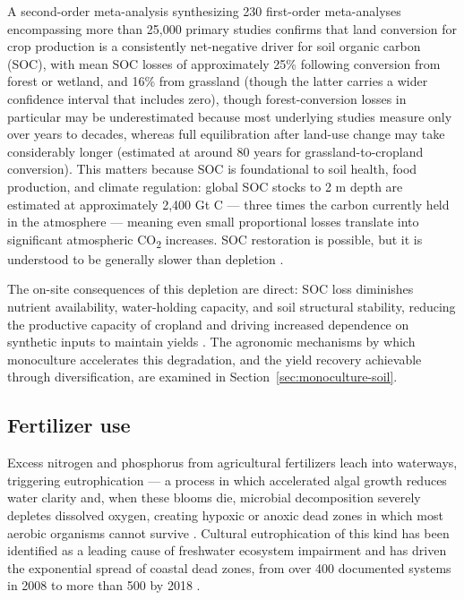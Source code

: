 A second-order meta-analysis synthesizing 230 first-order meta-analyses encompassing more than 25,000 primary studies confirms that land conversion for crop production is a consistently net-negative driver for soil organic carbon (SOC), with mean SOC losses of approximately 25\% following conversion from forest or wetland, and 16\% from grassland (though the latter carries a wider confidence interval that includes zero), though forest-conversion losses in particular may be underestimated because most underlying studies measure only over years to decades, whereas full equilibration after land-use change may take considerably longer (estimated at around 80 years for grassland-to-cropland conversion). This matters because SOC is foundational to soil health, food production, and climate regulation: global SOC stocks to 2 m depth are estimated at approximately 2,400 Gt C — three times the carbon currently held in the atmosphere — meaning even small proportional losses translate into significant atmospheric CO\textsubscript{2} increases. SOC restoration is possible, but it is understood to be generally slower than depletion \cite{beillouin2023soc}.

The on-site consequences of this depletion are direct: SOC loss diminishes nutrient availability, water-holding capacity, and soil structural stability, reducing the productive capacity of cropland and driving increased dependence on synthetic inputs to maintain yields \cite[pp.~4--5]{lal2004soilcarbon}. The agronomic mechanisms by which monoculture accelerates this degradation, and the yield recovery achievable through diversification, are examined in Section~\ref{sec:monoculture-soil}.

\subsection{Fertilizer use}\label{sec:fertilizers}
Excess nitrogen and phosphorus from agricultural fertilizers leach into waterways, triggering eutrophication — a process in which accelerated algal growth reduces water clarity and, when these blooms die, microbial decomposition severely depletes dissolved oxygen, creating hypoxic or anoxic dead zones in which most aerobic organisms cannot survive \cite[Consequences]{chislock2013}. Cultural eutrophication of this kind has been identified as a leading cause of freshwater ecosystem impairment \cite[p.~1]{carpenter1998nonpoint} and has driven the exponential spread of coastal dead zones, from over 400 documented systems in 2008 \cite[p.~926]{diaz2008} to more than 500 by 2018 \cite[p.~1]{breitburg2018oxygen}.

